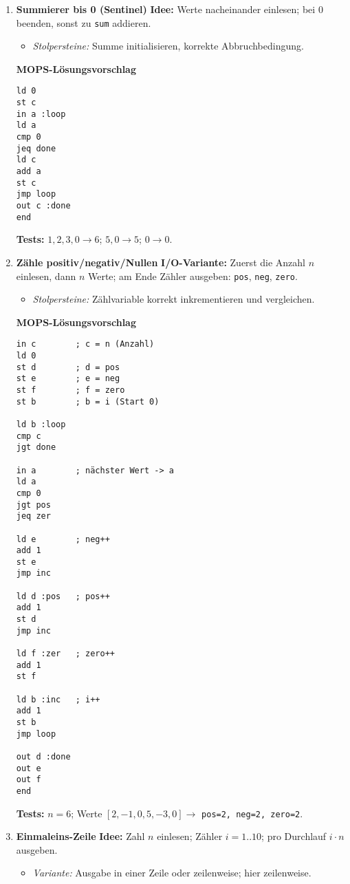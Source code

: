 \documentclass[11pt,a4paper]{scrartcl}
\begin{document}
\begin{enumerate}[leftmargin=*,label=\textbf{Aufgabe~\arabic*:}, itemsep=1.0em, start=5]

\item \textbf{Summierer bis 0 (Sentinel)}\quad
\textbf{Idee:} Werte nacheinander einlesen; bei $0$ beenden, sonst zu \texttt{sum} addieren.
\begin{itemize}
  \item \emph{Stolpersteine:} Summe initialisieren, korrekte Abbruchbedingung.
\end{itemize}

\textbf{MOPS-Lösungsvorschlag}
\begin{verbatim}
ld 0
st c
in a :loop
ld a
cmp 0
jeq done
ld c
add a
st c
jmp loop
out c :done
end
\end{verbatim}

\textbf{Tests:} $1,2,3,0 \to 6$; $5,0 \to 5$; $0 \to 0$.

\item \textbf{Zähle positiv/negativ/Nullen}\quad
\textbf{I/O-Variante:} Zuerst die Anzahl $n$ einlesen, dann $n$ Werte; am Ende Zähler ausgeben: \texttt{pos}, \texttt{neg}, \texttt{zero}.
\begin{itemize}
  \item \emph{Stolpersteine:} Zählvariable korrekt inkrementieren und vergleichen.
\end{itemize}

\textbf{MOPS-Lösungsvorschlag}
\begin{verbatim}
in c        ; c = n (Anzahl)
ld 0
st d        ; d = pos
st e        ; e = neg
st f        ; f = zero
st b        ; b = i (Start 0)

ld b :loop
cmp c
jgt done

in a        ; nächster Wert -> a
ld a
cmp 0
jgt pos
jeq zer

ld e        ; neg++
add 1
st e
jmp inc

ld d :pos   ; pos++
add 1
st d
jmp inc

ld f :zer   ; zero++
add 1
st f

ld b :inc   ; i++
add 1
st b
jmp loop

out d :done
out e
out f
end
\end{verbatim}

\textbf{Tests:} $n=6$; Werte $[2,-1,0,5,-3,0] \to$ \texttt{pos=2, neg=2, zero=2}.

\item \textbf{Einmaleins-Zeile}\quad
\textbf{Idee:} Zahl $n$ einlesen; Zähler $i=1..10$; pro Durchlauf $i\cdot n$ ausgeben.
\begin{itemize}
  \item \emph{Variante:} Ausgabe in einer Zeile oder zeilenweise; hier zeilenweise.
\end{itemize}


\end{enumerate}
\end{document}

